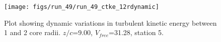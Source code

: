 \begin{figure}[H]
\centering
\texttt{[image: figs/run\_49/run\_49\_ctke\_12rdynamic]}
\caption{Plot showing dynamic variations in turbulent kinetic energy between 1 and 2 core radii. $z/c$=9.00, $V_{free}$=31.28, station 5.}
\label{fig:run_49_ctke_12rdynamic}
\end{figure}


